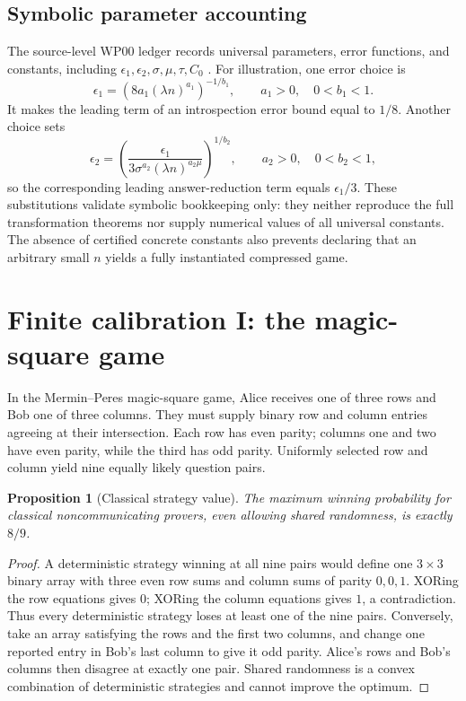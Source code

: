 \documentclass[11pt,a4paper]{article}
\newtheorem{proposition}{Proposition}
\begin{document}
\subsection{Symbolic parameter accounting}
The source-level WP00 ledger records universal parameters, error functions, and constants, including $\epsilon_1,\epsilon_2,\sigma,\mu,\tau,C_0$ \cite{gclledger}. For illustration, one error choice is
\begin{equation}
\epsilon_1=\left(8a_1(\lambda n)^{a_1}\right)^{-1/b_1},
\qquad a_1>0,\quad 0<b_1<1.
\end{equation}
It makes the leading term of an introspection error bound equal to $1/8$. Another choice sets
\begin{equation}
\epsilon_2=\left(\frac{\epsilon_1}{3\sigma^{a_2}(\lambda n)^{a_2\mu}}\right)^{1/b_2},
\qquad a_2>0,\quad 0<b_2<1,
\end{equation}
so the corresponding leading answer-reduction term equals $\epsilon_1/3$. These substitutions validate symbolic bookkeeping only: they neither reproduce the full transformation theorems nor supply numerical values of all universal constants. The absence of certified concrete constants also prevents declaring that an arbitrary small $n$ yields a fully instantiated compressed game.

\section{Finite calibration I: the magic-square game}
In the Mermin--Peres magic-square game, Alice receives one of three rows and Bob one of three columns. They must supply binary row and column entries agreeing at their intersection. Each row has even parity; columns one and two have even parity, while the third has odd parity. Uniformly selected row and column yield nine equally likely question pairs.

\begin{proposition}[Classical strategy value]
The maximum winning probability for classical noncommunicating provers, even allowing shared randomness, is exactly $8/9$.
\end{proposition}
\begin{proof}
A deterministic strategy winning at all nine pairs would define one $3\times3$ binary array with three even row sums and column sums of parity $0,0,1$. XORing the row equations gives $0$; XORing the column equations gives $1$, a contradiction. Thus every deterministic strategy loses at least one of the nine pairs. Conversely, take an array satisfying the rows and the first two columns, and change one reported entry in Bob's last column to give it odd parity. Alice's rows and Bob's columns then disagree at exactly one pair. Shared randomness is a convex combination of deterministic strategies and cannot improve the optimum.
\end{proof}
\end{document}
